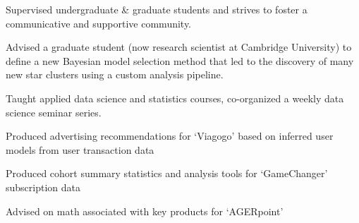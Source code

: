 \documentclass[letterpaper,12pt]{deedy-resume}
\begin{document}
\begin{minipage}[t]{0.64\textwidth}
\begin{tightitemize}
    \item Supervised undergraduate \& graduate students and strives to foster a communicative and supportive community.
    \item Advised a graduate student (now research scientist at Cambridge University) to define a new Bayesian model selection method that led to the discovery of many new star clusters using a custom analysis pipeline.
    \item Taught applied data science and statistics courses, co-organized a weekly data science seminar series.
\end{tightitemize}

\sectionspace %



\begin{tightitemize}
    \item Produced advertising recommendations for `Viagogo' based on inferred user models from user transaction data
    \item Produced cohort summary statistics and analysis tools for `GameChanger' subscription data
    \item Advised on math associated with key products for `AGERpoint'
\end{tightitemize}

\sectionspace %





\end{minipage}
\end{document}
